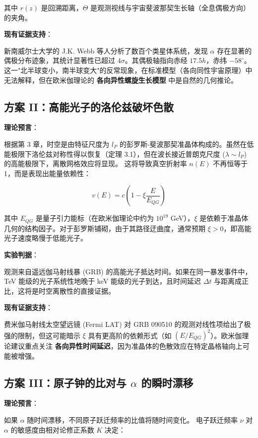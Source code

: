 其中 $r(z)$ 是回溯距离，$\Theta$ 是观测视线与宇宙斐波那契生长轴（全息偶极方向）的夹角。

\textbf{现有证据支持}：

新南威尔士大学的 J.K. Webb 等人分析了数百个类星体系统，发现 $\alpha$ 存在显著的偶极分布迹象，其统计显著性已超过 $4\sigma$。其偶极轴指向赤经 $17.5h$，赤纬 $-58^\circ$。这一"北半球变小，南半球变大"的反常现象，在标准模型（各向同性宇宙原理）中无法解释，但在欧米伽理论的 \textbf{各向异性螺旋生长模型} 中是自然的几何推论。

\subsection{方案 II：高能光子的洛伦兹破坏色散}

\textbf{理论预言}：

根据第 3 章，时空是由特征尺度为 $l_P$ 的彭罗斯-斐波那契准晶体构成的。虽然在低能极限下洛伦兹对称性得以恢复（定理 3.1），但在波长接近普朗克尺度 ($\lambda \sim l_P$) 的高能极限下，离散网格效应将显现。
这将导致真空折射率 $n(E)$ 不再恒等于 1，而是表现出能量依赖性：

\[v(E) = c \left( 1 - \xi \frac{E}{E_{QG}} \right)\]

其中 $E_{QG}$ 是量子引力能标（在欧米伽理论中约为 $10^{19}$ GeV），$\xi$ 是依赖于准晶体几何的结构因子。对于彭罗斯铺砌，由于其路径迂曲度，通常预期 $\xi > 0$，即高能光子速度略慢于低能光子。

\textbf{实验判据}：

观测来自遥远伽马射线暴 (GRB) 的高能光子抵达时间。如果在同一暴发事件中，TeV 能级的光子系统性地晚于 keV 能级的光子到达，且时间延迟 $\Delta t$ 与距离成正比，这将是时空离散性的直接证据。

\textbf{现有证据支持}：

费米伽马射线太空望远镜 (Fermi LAT) 对 GRB 090510 的观测对线性项给出了极强的限制，但这可能暗示 $\xi$ 具有更高阶的依赖形式（如 $(E/E_{QG})^2$）。欧米伽理论建议重点关注 \textbf{各向异性时间延迟}，因为准晶体的色散效应在特定晶格轴向上可能被增强。

\subsection{方案 III：原子钟的比对与 $\alpha$ 的瞬时漂移}

\textbf{理论预言}：

如果 $\alpha$ 随时间漂移，不同原子跃迁频率的比值将随时间变化。
电子跃迁频率 $\nu$ 对 $\alpha$ 的敏感度由相对论修正系数 $K$ 决定：

